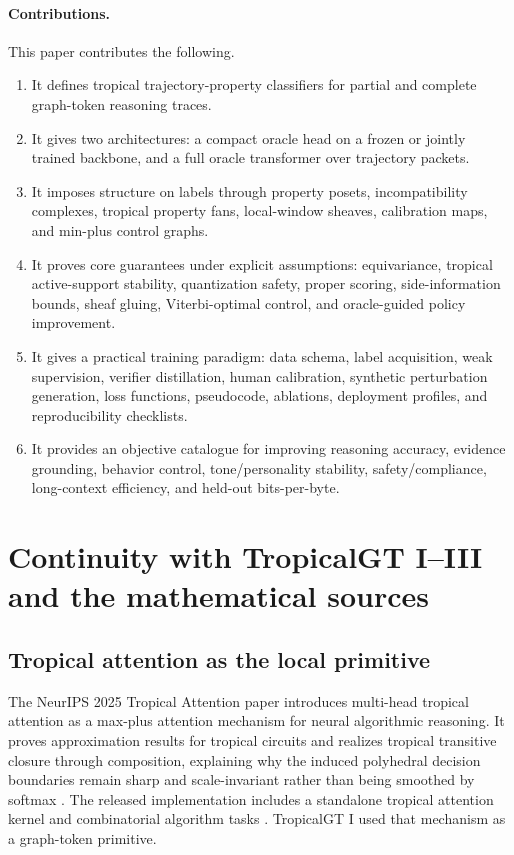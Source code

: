 \documentclass[11pt]{article}
\theoremstyle{definition}
\theoremstyle{remark}
\numberwithin{equation}{section}
\begin{document}
\paragraph{Contributions.}
This paper contributes the following.
\begin{enumerate}
    \item It defines tropical trajectory-property classifiers for partial and complete graph-token reasoning traces.
    \item It gives two architectures: a compact oracle head on a frozen or jointly trained backbone, and a full oracle transformer over trajectory packets.
    \item It imposes structure on labels through property posets, incompatibility complexes, tropical property fans, local-window sheaves, calibration maps, and min-plus control graphs.
    \item It proves core guarantees under explicit assumptions: equivariance, tropical active-support stability, quantization safety, proper scoring, side-information bounds, sheaf gluing, Viterbi-optimal control, and oracle-guided policy improvement.
    \item It gives a practical training paradigm: data schema, label acquisition, weak supervision, verifier distillation, human calibration, synthetic perturbation generation, loss functions, pseudocode, ablations, deployment profiles, and reproducibility checklists.
    \item It provides an objective catalogue for improving reasoning accuracy, evidence grounding, behavior control, tone/personality stability, safety/compliance, long-context efficiency, and held-out bits-per-byte.
\end{enumerate}

\section{Continuity with TropicalGT I--III and the mathematical sources}

\subsection{Tropical attention as the local primitive}
The NeurIPS 2025 Tropical Attention paper introduces multi-head tropical attention as a max-plus attention mechanism for neural algorithmic reasoning.  It proves approximation results for tropical circuits and realizes tropical transitive closure through composition, explaining why the induced polyhedral decision boundaries remain sharp and scale-invariant rather than being smoothed by softmax \cite{hashemi2025openreview,hashemi2025arxiv}.  The released implementation includes a standalone tropical attention kernel and combinatorial algorithm tasks \cite{hashemi2025code}.  TropicalGT I used that mechanism as a graph-token primitive.
\end{document}
